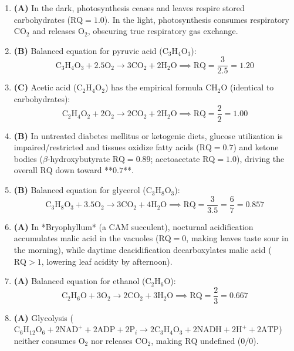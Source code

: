 \documentclass[11pt, a4paper]{article}
\begin{document}
\begin{enumerate}[label=\textbf{\arabic*.}]
\item \textbf{(A)} In the dark, photosynthesis ceases and leaves respire stored carbohydrates ($\text{RQ} = 1.0$). In the light, photosynthesis consumes respiratory $\text{CO}_2$ and releases $\text{O}_2$, obscuring true respiratory gas exchange.

\item \textbf{(B)} Balanced equation for pyruvic acid ($\text{C}_3\text{H}_4\text{O}_3$):
$$\text{C}_3\text{H}_4\text{O}_3 + 2.5\text{O}_2 \longrightarrow 3\text{CO}_2 + 2\text{H}_2\text{O} \implies \text{RQ} = \frac{3}{2.5} = \mathbf{1.20}$$

\item \textbf{(C)} Acetic acid ($\text{C}_2\text{H}_4\text{O}_2$) has the empirical formula $\text{CH}_2\text{O}$ (identical to carbohydrates):
$$\text{C}_2\text{H}_4\text{O}_2 + 2\text{O}_2 \longrightarrow 2\text{CO}_2 + 2\text{H}_2\text{O} \implies \text{RQ} = \frac{2}{2} = \mathbf{1.00}$$

\item \textbf{(B)} In untreated diabetes mellitus or ketogenic diets, glucose utilization is impaired/restricted and tissues oxidize fatty acids ($\text{RQ} = 0.7$) and ketone bodies ($\beta$-hydroxybutyrate $\text{RQ} = 0.89$; acetoacetate $\text{RQ} = 1.0$), driving the overall $\text{RQ}$ down toward **$0.7$**.

\item \textbf{(B)} Balanced equation for glycerol ($\text{C}_3\text{H}_8\text{O}_3$):
$$\text{C}_3\text{H}_8\text{O}_3 + 3.5\text{O}_2 \longrightarrow 3\text{CO}_2 + 4\text{H}_2\text{O} \implies \text{RQ} = \frac{3}{3.5} = \frac{6}{7} = \mathbf{0.857}$$

\item \textbf{(A)} In *Bryophyllum* (a CAM succulent), nocturnal acidification accumulates malic acid in the vacuoles ($\text{RQ} = 0$, making leaves taste sour in the morning), while daytime deacidification decarboxylates malic acid ($\text{RQ} > 1$, lowering leaf acidity by afternoon).

\item \textbf{(A)} Balanced equation for ethanol ($\text{C}_2\text{H}_6\text{O}$):
$$\text{C}_2\text{H}_6\text{O} + 3\text{O}_2 \longrightarrow 2\text{CO}_2 + 3\text{H}_2\text{O} \implies \text{RQ} = \frac{2}{3} = \mathbf{0.667}$$

\item \textbf{(A)} Glycolysis ($\text{C}_6\text{H}_{12}\text{O}_6 + 2\text{NAD}^+ + 2\text{ADP} + 2\text{P}_i \rightarrow 2\text{C}_3\text{H}_4\text{O}_3 + 2\text{NADH} + 2\text{H}^+ + 2\text{ATP}$) neither consumes $\text{O}_2$ nor releases $\text{CO}_2$, making $\text{RQ}$ undefined ($0/0$).


\end{enumerate}
\end{document}
